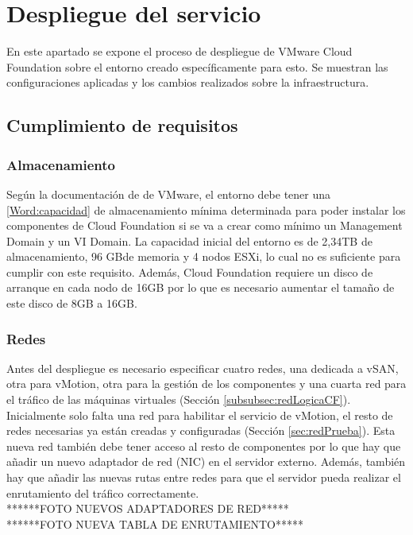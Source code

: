 

\section{Despliegue del servicio}
En este apartado se expone el proceso de despliegue de VMware Cloud Foundation sobre el entorno creado específicamente para esto. Se muestran las configuraciones aplicadas y los cambios realizados sobre la infraestructura.

\subsection{Cumplimiento de requisitos}

\subsubsection{Almacenamiento}
Según la documentación de de VMware, el entorno debe tener una \ref{Word:capacidad} de almacenamiento mínima determinada para poder instalar los componentes de Cloud Foundation si se va a crear como mínimo un Management Domain y un VI Domain. La capacidad inicial del entorno es de 2,34TB de almacenamiento, 96 GBde memoria y 4 nodos ESXi, lo cual no es suficiente para cumplir con este requisito.
Además, Cloud Foundation requiere un disco de arranque en cada nodo de 16GB por lo que es necesario aumentar el tamaño de este disco de 8GB a 16GB.


\subsubsection{Redes}
Antes del despliegue es necesario especificar cuatro redes, una dedicada a vSAN, otra para vMotion, otra para la gestión de los componentes y una cuarta red para el tráfico de las máquinas virtuales (Sección \ref{subsubsec:redLogicaCF}). Inicialmente solo falta una red para habilitar el servicio de vMotion, el resto de redes necesarias ya están creadas y configuradas (Sección \ref{sec:redPrueba}). Esta nueva red también debe tener acceso al resto de componentes por lo que hay que añadir un nuevo adaptador de red (NIC) en el servidor externo. Además, también hay que añadir las nuevas rutas entre redes para que el servidor pueda realizar el enrutamiento del tráfico correctamente.\\
******FOTO NUEVOS ADAPTADORES DE RED*****\\
******FOTO NUEVA TABLA DE ENRUTAMIENTO*****\\

